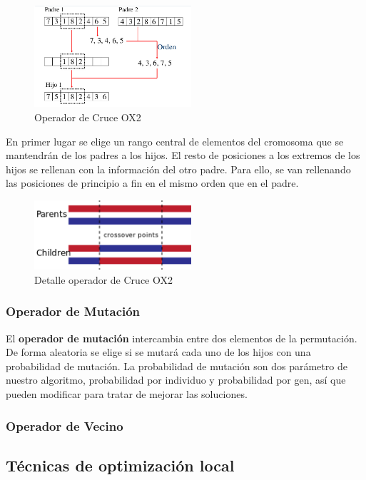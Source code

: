 \begin{figure}[ht!]
\centering
\includegraphics[width=220px]{../images/crossover_ox.jpg}
\caption{Operador de Cruce OX2 \label{cruce_ox}}
\end{figure}


En primer lugar se elige un rango central de elementos del cromosoma que se mantendrán de los padres a los hijos. El resto de posiciones a los extremos de los hijos se rellenan con la información del otro padre. Para ello, se van rellenando las posiciones de principio a fin en el mismo orden que en el padre.

\begin{figure}[ht!]
\centering
\includegraphics[width=220px]{../images/TwoPointCrossover}
\caption{Detalle operador de Cruce OX2 \label{cruce_ox_2}}
\end{figure}


\subsubsection{Operador de Mutación}

\bigskip
El \textbf{operador de mutación} intercambia entre dos elementos de la permutación. De forma aleatoria se elige si se mutará cada uno de los hijos con una probabilidad de mutación. La probabilidad de mutación son dos parámetro de nuestro algoritmo, probabilidad por individuo y probabilidad por gen, así que pueden modificar para tratar de mejorar las soluciones.

\subsubsection{Operador de Vecino}

\subsection{Técnicas de optimización local}

